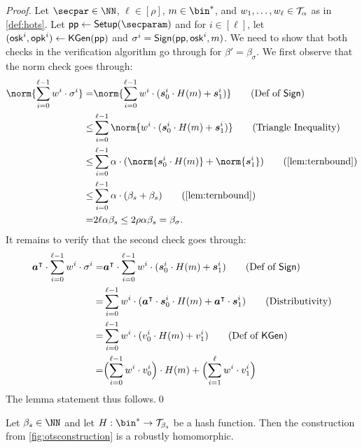 \begin{proof}
  Let $\secpar\in\NN$, $\ell\in[\rho]$, $m\in\bin^*$, and $w_1,\dots,w_\ell \in \mathcal{T}_\alpha$ as in \autoref{def:hots}.
  Let $\params\gets\setup(\secparam)$ and for $i\in[\ell]$, let $(\mathsf{osk}^i,\mathsf{opk}^i) \gets \mathsf{KGen}(\mathsf{pp})$ and $\sigma^i = \mathsf{Sign}(\mathsf{pp},\mathsf{osk}^i,m)$.
  We need to show that both checks in the verification algorithm go through for $\beta'=\beta_\sigma$.
  We first observe that the norm check goes through:
      \begin{align*}
    \norm{\sum_{i=0}^{\ell-1}w^i\cdot\sigma^i}=&\norm{\sum_{i=0}^{\ell-1}w^i\cdot(\vec{s}_0^i\cdot H(m)+\vec{s}_1^i)}\tag{Def of $\sign$}\\
    \leq& \sum_{i=0}^{\ell-1} \norm{w^i\cdot(\vec{s}_0^i\cdot H(m)+\vec{s}_1^i)}\tag{Triangle Inequality}\\
    \leq& \sum_{i=0}^{\ell-1} \alpha\cdot(\norm{\vec{s}_0^i\cdot H(m)}+\norm{\vec{s}_1^i})\tag{\autoref{lem:ternbound}}\\
    \leq& \sum_{i=0}^{\ell-1} \alpha \cdot(\beta_s+\beta_s) \tag{\autoref{lem:ternbound}}\\
    =&2\ell\alpha \beta_s \leq 2\rho\alpha \beta_s =\beta_\sigma.
  \end{align*}
  It remains to verify that the second check goes through:
  \begin{align*}
    \vec{a}^\intercal\cdot \sum_{i=0}^{\ell-1}w^i\cdot\sigma^i
    =&\vec{a}^\intercal\cdot \sum_{i=0}^{\ell-1}w^i\cdot(\vec{s}_0^i\cdot H(m)+\vec{s}_1^i)\tag{Def of $\sign$}\\
    =&\sum_{i=0}^{\ell-1}w^i\cdot(\vec{a}^\intercal\cdot\vec{s}_0^i\cdot H(m)+\vec{a}^\intercal\cdot\vec{s}_1^i)\tag{Distributivity}\\
    =&\sum_{i=0}^{\ell-1}w^i\cdot(v_0^i\cdot H(m)+v_1^i)\tag{Def of $\kgen$}\\
    =& \Bigl(\sum_{i=0}^{\ell-1}w^i\cdot v^i_0\Bigr)\cdot H(m) + \Bigl(\sum_{i=1}^{\ell}w^i\cdot v^i_1\Bigr)
  \end{align*}
  The lemma statement thus follows.\qed
\end{proof}


\begin{lemma}\label{lem:hots_homomorphic}
  Let $\beta_s\in\NN$ and let $H : \bin^* \to \tern_{\beta_s}$ be a hash function.
  Then the construction from \autoref{fig:otsconstruction} is a robustly homomorphic.
\end{lemma}


